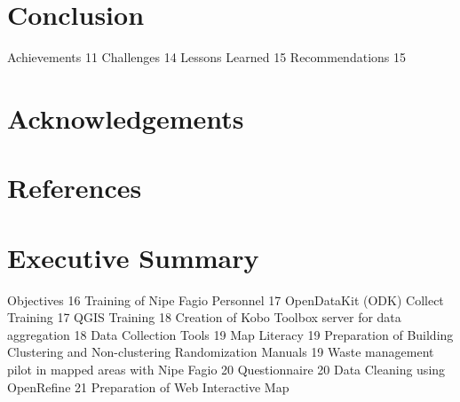 \documentclass[a4paper,12pt,twoside]{article}
\begin{document}
\begin{multicols}{2}
\lipsum[0-5]
\end{multicols}

\section{Conclusion}

\begin{multicols}{2}
\lipsum[0-5]
\end{multicols}

Achievements	11
Challenges	14
Lessons Learned	15
Recommendations	15

\section{Acknowledgements}

\begin{multicols}{2}
\lipsum[0-5]
\end{multicols}

\section{References}

\begin{multicols}{2}
\lipsum[0-5]
\end{multicols}

\section{Executive Summary}

\begin{multicols}{2}
\lipsum[0-5]
\end{multicols}

Objectives	16
Training of Nipe Fagio Personnel	17
OpenDataKit (ODK) Collect Training	17
QGIS Training	18
Creation of Kobo Toolbox  server for data aggregation	18
Data Collection Tools	19
Map Literacy	19
Preparation of Building Clustering and Non-clustering Randomization Manuals	19
Waste management pilot in mapped areas with Nipe Fagio	20
Questionnaire	20
Data Cleaning using OpenRefine	21
Preparation of Web Interactive Map
\end{document}
